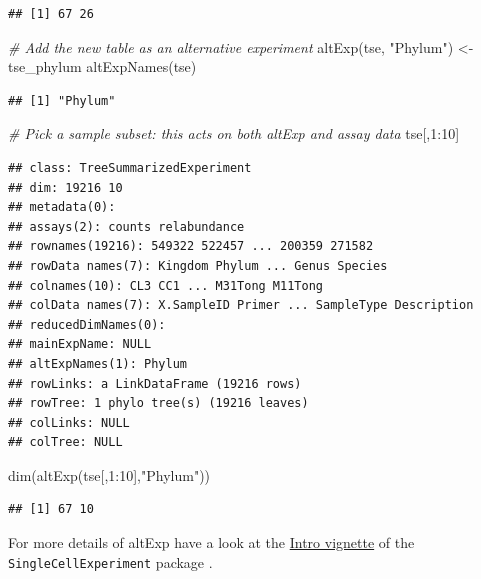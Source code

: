 \documentclass[
]{book}
\newenvironment{Shaded}{\begin{snugshade}}{\end{snugshade}}
\newcommand{\CommentTok}[1]{\textcolor[rgb]{0.56,0.35,0.01}{\textit{#1}}}
\newcommand{\DecValTok}[1]{\textcolor[rgb]{0.00,0.00,0.81}{#1}}
\newcommand{\FunctionTok}[1]{\textcolor[rgb]{0.00,0.00,0.00}{#1}}
\newcommand{\NormalTok}[1]{#1}
\newcommand{\OtherTok}[1]{\textcolor[rgb]{0.56,0.35,0.01}{#1}}
\newcommand{\SpecialCharTok}[1]{\textcolor[rgb]{0.00,0.00,0.00}{#1}}
\newcommand{\StringTok}[1]{\textcolor[rgb]{0.31,0.60,0.02}{#1}}
\begin{document}
\begin{verbatim}
## [1] 67 26
\end{verbatim}

\begin{Shaded}
\begin{Highlighting}[]
\CommentTok{\# Add the new table as an alternative experiment}
\FunctionTok{altExp}\NormalTok{(tse, }\StringTok{"Phylum"}\NormalTok{) }\OtherTok{\textless{}{-}}\NormalTok{ tse\_phylum}
\FunctionTok{altExpNames}\NormalTok{(tse)}
\end{Highlighting}
\end{Shaded}

\begin{verbatim}
## [1] "Phylum"
\end{verbatim}

\begin{Shaded}
\begin{Highlighting}[]
\CommentTok{\# Pick a sample subset: this acts on both altExp and assay data}
\NormalTok{tse[,}\DecValTok{1}\SpecialCharTok{:}\DecValTok{10}\NormalTok{]}
\end{Highlighting}
\end{Shaded}

\begin{verbatim}
## class: TreeSummarizedExperiment 
## dim: 19216 10 
## metadata(0):
## assays(2): counts relabundance
## rownames(19216): 549322 522457 ... 200359 271582
## rowData names(7): Kingdom Phylum ... Genus Species
## colnames(10): CL3 CC1 ... M31Tong M11Tong
## colData names(7): X.SampleID Primer ... SampleType Description
## reducedDimNames(0):
## mainExpName: NULL
## altExpNames(1): Phylum
## rowLinks: a LinkDataFrame (19216 rows)
## rowTree: 1 phylo tree(s) (19216 leaves)
## colLinks: NULL
## colTree: NULL
\end{verbatim}

\begin{Shaded}
\begin{Highlighting}[]
\FunctionTok{dim}\NormalTok{(}\FunctionTok{altExp}\NormalTok{(tse[,}\DecValTok{1}\SpecialCharTok{:}\DecValTok{10}\NormalTok{],}\StringTok{"Phylum"}\NormalTok{))}
\end{Highlighting}
\end{Shaded}

\begin{verbatim}
## [1] 67 10
\end{verbatim}

For more details of altExp have a look at the \href{https://bioconductor.org/packages/release/bioc/vignettes/SingleCellExperiment/inst/doc/intro.html}{Intro vignette} of the
\texttt{SingleCellExperiment} package \citep{R-SingleCellExperiment}.
\end{document}
